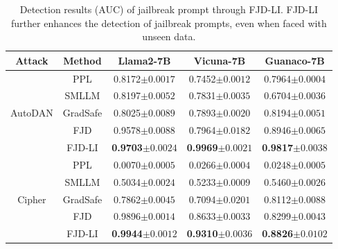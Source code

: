 \documentclass{article}
\begin{document}
\begin{table}
\vspace{-4cm}

  \caption{Detection results (AUC) of jailbreak prompt through FJD-LI. FJD-LI further enhances the detection of jailbreak prompts, even when faced with unseen data.}

  \label{learnable-prom}
  \centering
  \setlength\tabcolsep{2pt}
  \scriptsize
  \begin{tabular}{ccccc}
    \toprule
    \textbf{Attack}  & \textbf{Method}  & \textbf{Llama2-7B}  & \textbf{Vicuna-7B}& \textbf{Guanaco-7B}\\
    \midrule
     
    \multirow{5}{*}{AutoDAN}
    & PPL  & 0.8172\tiny{$\pm 0.0017$} & 0.7452\tiny{$\pm 0.0012$} &0.7964\tiny{$\pm 0.0004$}\\
    & SMLLM & 0.8197\tiny{$\pm 0.0052$} & 0.7831\tiny{$\pm 0.0035$} &0.6704\tiny{$\pm 0.0036$}\\
    & GradSafe & 0.8025\tiny{$\pm 0.0089$} & 0.7893\tiny{$\pm 0.0020$} & 0.8194\tiny{$\pm 0.0051$} \\
    & FJD & 0.9578\tiny{$\pm 0.0088$} & 0.7964\tiny{$\pm 0.0182$} &0.8946\tiny{$\pm 0.0065$}\\
    \rowcolor{lightgray} & FJD-LI & \textbf{0.9703}\tiny{$\pm 0.0024$} &  \textbf{0.9969}\tiny{$\pm 0.0021$}&\textbf{0.9817}\tiny{$\pm 0.0038$}\\
    \midrule
    \multirow{5}{*}{Cipher}   
    & PPL & 0.0070\tiny{$\pm 0.0005$} & 0.0266\tiny{$\pm 0.0004$} &0.0248\tiny{$\pm 0.0005$}\\
    & SMLLM & 0.5034\tiny{$\pm 0.0024$} & 0.5233\tiny{$\pm 0.0009$} &0.5460\tiny{$\pm 0.0026$} \\
    & GradSafe & 0.7862\tiny{$\pm 0.0045$} & 0.7094\tiny{$\pm 0.0201$} & 0.8112\tiny{$\pm 0.0088$} \\
    & FJD & 0.9896\tiny{$\pm 0.0014$} & 0.8633\tiny{$\pm 0.0033$} &0.8299\tiny{$\pm 0.0043$}\\
    \rowcolor{lightgray} & FJD-LI & \textbf{0.9944}\tiny{$\pm 0.0012$} & \textbf{0.9310}\tiny{$\pm 0.0036$} &\textbf{0.8826}\tiny{$\pm 0.0102$}\\
    
    \bottomrule
  \end{tabular}
  \vspace{-0.6cm}

\end{table}
\end{document}
